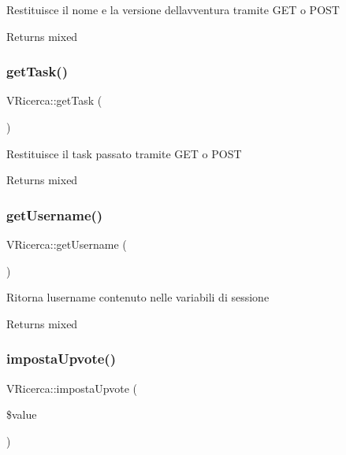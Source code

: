 Restituisce il nome e la versione dell\textquotesingle{}avventura tramite G\+ET o P\+O\+ST

\begin{DoxyReturn}{Returns}
mixed 
\end{DoxyReturn}
\mbox{\label{class_v_ricerca_ae254a1328432be4162826bf9b34035c6}} 
\subsubsection{\texorpdfstring{get\+Task()}{getTask()}}
{\footnotesize\ttfamily V\+Ricerca\+::get\+Task (\begin{DoxyParamCaption}{ }\end{DoxyParamCaption})}

Restituisce il task passato tramite G\+ET o P\+O\+ST

\begin{DoxyReturn}{Returns}
mixed 
\end{DoxyReturn}
\mbox{\label{class_v_ricerca_a132e577e786b857bb1381258835dd710}} 
\subsubsection{\texorpdfstring{get\+Username()}{getUsername()}}
{\footnotesize\ttfamily V\+Ricerca\+::get\+Username (\begin{DoxyParamCaption}{ }\end{DoxyParamCaption})}

Ritorna l\textquotesingle{}username contenuto nelle variabili di sessione

\begin{DoxyReturn}{Returns}
mixed 
\end{DoxyReturn}
\mbox{\label{class_v_ricerca_a30341bd57866dd8155655fa8b64ed74c}} 
\subsubsection{\texorpdfstring{imposta\+Upvote()}{impostaUpvote()}}
{\footnotesize\ttfamily V\+Ricerca\+::imposta\+Upvote (\begin{DoxyParamCaption}\item[{}]{\$value }\end{DoxyParamCaption})}

